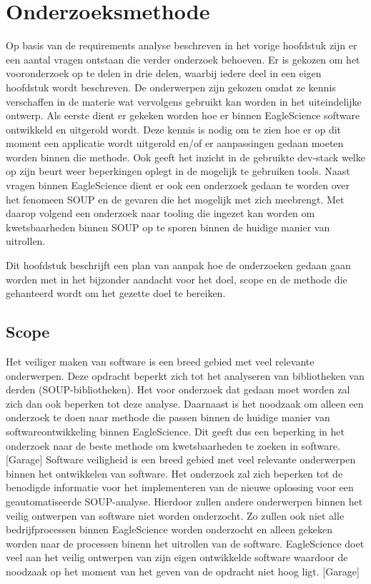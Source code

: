 \chapter{Onderzoeksmethode}\label{ch:onderzoeksmethode} %

Op basis van de requirements analyse beschreven in het vorige hoofdstuk zijn er een aantal vragen ontstaan die verder onderzoek behoeven. Er is gekozen om het vooronderzoek op te delen in drie delen, waarbij iedere deel in een eigen hoofdstuk wordt beschreven. De onderwerpen zijn gekozen omdat ze kennis verschaffen in de materie wat vervolgens gebruikt kan worden in het uiteindelijke ontwerp.
Als eerste dient er gekeken worden hoe er binnen EagleScience software ontwikkeld en uitgerold wordt. Deze kennis is nodig om te zien hoe er op dit moment een applicatie wordt uitgerold en/of er aanpassingen gedaan moeten worden binnen die methode. Ook geeft het inzicht in de gebruikte dev-stack welke op zijn beurt weer beperkingen oplegt in de mogelijk te gebruiken tools. Naast vragen binnen EagleScience dient er ook een onderzoek gedaan te worden over het fenomeen SOUP en de gevaren die het mogelijk met zich meebrengt. Met daarop volgend een onderzoek naar tooling die ingezet kan worden om kwetsbaarheden binnen SOUP op te sporen binnen de huidige manier van uitrollen.

Dit hoofdstuk beschrijft een plan van aanpak hoe de onderzoeken gedaan gaan worden met in het bijzonder aandacht voor het doel, scope en de methode die gehanteerd wordt om het gezette doel te bereiken.

\section{Scope}\label{sec:Scope}
Het veiliger maken van software is een breed gebied met veel relevante onderwerpen. Deze opdracht beperkt zich tot het analyseren van bibliotheken van derden (SOUP-bibliotheken). Het voor onderzoek dat gedaan moet worden zal zich dan ook beperken tot deze analyse. Daarnaast is het noodzaak om alleen een onderzoek te doen naar methode die passen binnen de huidige manier van softwareontwikkeling binnen EagleScience. Dit geeft dus een beperking in het onderzoek naar de beste methode om kwetsbaarheden te zoeken in software.
[Garage]
Software veiligheid is een breed gebied met veel relevante onderwerpen binnen het ontwikkelen van software.
Het onderzoek zal zich beperken tot de benodigde informatie voor het implementeren van de nieuwe oplossing voor een geautomatiseerde SOUP-analyse. Hierdoor zullen andere onderwerpen binnen het veilig ontwerpen van software niet worden onderzocht. Zo zullen ook niet alle bedrijfprocessen binnen EagleScience worden onderzocht en alleen gekeken worden naar de processen binenn het uitrollen van de software. EagleScience doet veel aan het veilig ontwerpen van zijn eigen ontwikkelde software waardoor de noodzaak op het moment van het geven van de opdracht niet hoog ligt.
[Garage]
